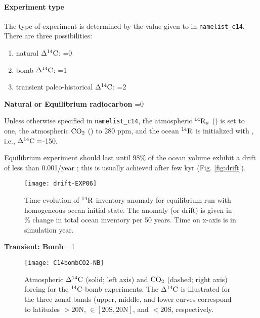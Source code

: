 \documentclass[../main/TOP_manual]{subfiles}
\begin{document}
%
\paragraph{Experiment type}
The type of experiment is determined by the value given to  in \texttt{namelist\_c14}.
There are three possibilities:

\begin{enumerate}
\item natural                    $\Delta ^{14}\mathrm{C}$: =0
\item bomb                       $\Delta ^{14}\mathrm{C}$: =1
\item transient paleo-historical $\Delta ^{14}\mathrm{C}$: =2
\end{enumerate}

% 
\textbf{Natural or Equilibrium radiocarbon}
=0

Unless otherwise specified in \texttt{namelist\_c14}, the atmospheric $\mathrm{^{14}{R}}_a$ () is set to one, the atmospheric $\mathrm{CO_2}$ () to 280 ppm, and the ocean $\mathrm{^{14}{R}}$ is initialized with , i.e., $\Delta ^{14}\mathrm{C}=$-150\textperthousand \cite[typical for deep-ocean, Fig 6 in][]{key_2004}.

Equilibrium experiment should last until 98\% of the ocean volume exhibit a drift of less than 0.001\textperthousand/year \citep{orr_2000}; this is usually achieved after few kyr (Fig. \autoref{fig:drift}).
%

\begin{figure}[!h]
\begin{center}
\texttt{[image: drift-EXP06]}
\end{center}
\vspace{-4ex}
\caption{ Time evolution of $\mathrm{^{14}{R}}$ inventory anomaly for equilibrium run with homogeneous ocean initial state.
The anomaly (or drift) is given in \%  change in total ocean inventory per 50 years.
Time on x-axis is in simulation year.\label{fig:drift} }
\end{figure}

\textbf{Transient: Bomb}
\label{sec:bomb}
=1

\begin{figure}[!h]
\begin{center}
\texttt{[image: C14bombCO2-NB]}
\end{center}
\vspace{-4ex}
\caption{Atmospheric $\Delta ^{14}\mathrm{C}$ (solid; left axis) and $\mathrm{CO_2}$ (dashed; right axis)  forcing for the $\mathrm{^{14}C}$-bomb experiments.
The $\Delta ^{14}\mathrm{C}$ is illustrated for the three zonal bands (upper, middle, and lower curves correspond to latitudes $> 20$N, $\in [20\mathrm{S},20\mathrm{N}]$, and $< 20$S, respectively.} \label{fig:bomb}
\end{figure}
\end{document}
